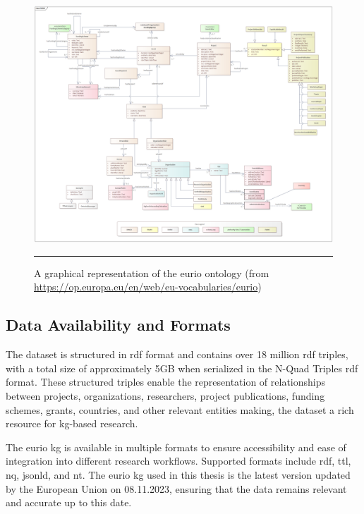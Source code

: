 \begin{figure}[htbp]
    \centering
 \includegraphics[width=\textwidth]{figures/architecture/EURIO_V2.4.png}
     \rule{35em}{0.5pt}
    \caption{A graphical representation of the \gls{eurio} ontology (from \url{https://op.europa.eu/en/web/eu-vocabularies/eurio})}
 \label{fig:eurio-ontology}
\end{figure}
\newpage

\subsection*{Data Availability and Formats}
The dataset is structured in \gls{rdf} format and contains over 18 million \gls{rdf} triples, with a total size of approximately 5GB when serialized in the N-Quad Triples \gls{rdf} format.
These structured triples enable the representation of relationships between projects, organizations, researchers, project publications, funding schemes, grants, countries, and other relevant entities making, the dataset a rich resource for \gls{kg}-based research.

The \gls{eurio} \gls{kg} is available in multiple formats to ensure accessibility and ease of integration into different research workflows.
Supported formats include \gls{rdf}, \gls{ttl}, \gls{nq}, \gls{jsonld}, and \gls{nt}.
The \gls{eurio} \gls{kg} used in this thesis is the latest version updated by the European Union on 08.11.2023, ensuring that the data remains relevant and accurate up to this date.


